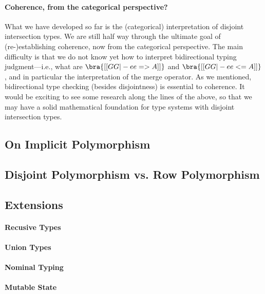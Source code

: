\paragraph{Coherence, from the categorical perspective?}

What we have developed so far is the (categorical) interpretation of disjoint intersection
types. We are still half way through the ultimate goal of (re-)establishing
coherence, now from the categorical perspective. The main difficulty is that we
do not know yet how to interpret bidirectional typing judgment---i.e., what are
$\bra{[[GG |- ee => A]]}$ and $\bra{[[GG |- ee <= A]]}$, and in particular the
interpretation of the merge operator. As we mentioned, bidirectional type checking
(besides disjointness) is essential to coherence. It would be exciting to see
some research along the lines of the above, so that we may have a solid
mathematical foundation for type systems with disjoint intersection types.

\subsection{On Implicit Polymorphism}
\label{sec:implicit}


\subsection{Disjoint Polymorphism vs. Row Polymorphism}



\subsection{Extensions}

\paragraph{Recusive Types}


\paragraph{Union Types}

\paragraph{Nominal Typing}


\paragraph{Mutable State}



